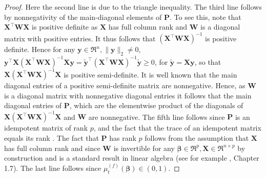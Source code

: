 \documentclass[11pt, a4paper]{article}
\newcommand*{\bb}{\boldsymbol}
\theoremstyle{example} \newtheorem{example}{Example}[section]
\theoremstyle{theorem} \newtheorem{theorem}{Theorem}[section]
\def\by{\bb{y}}
\def\bX{\bb{X}}
\def\by{\bb{y}}
\begin{document}
\begin{proof}
	Here the second line is due to the triangle inequality. The third line follows by nonnegativity of the main-diagonal elements of $\bb P$. To see this, note that $\bb X^\top\bb W\bb X$ is positive definite as $\bb X$ has full column rank and $\bb W$ is a diagonal matrix with positive entries. It thus follows that $(\bb X^\top\bb W\bb X)^{-1}$ is positive definite. Hence for any $\bb y \in \Re^{n}, \|\bb y\|_2\neq 0$, $\bb y^\top\bb X(\bb X^\top\bb W\bb X)^{-1}\bb X \bb y = \tilde{\bb y}^\top(\bb X^\top\bb W\bb X)^{-1} \tilde{\bb y} \geq 0$, for $\tilde{\by} = \bX \by$, so that $\bb X(\bb X^\top\bb W\bb X)^{-1}\bb X$ is positive semi-definite. It is well known that the main diagonal entries of a positive semi-definite matrix are nonnegative. Hence, as $\bb W$ is a diagonal matrix with nonnegative diagonal entries it follows that the main diagonal entries of $\bb P$, which are the elementwise product of the diagonals of $\bb X(\bb X^\top\bb W\bb X)^{-1}\bb X$ and $\bb W$ are nonnegative. The fifth line follows since $\bb P$ is an idempotent matrix of rank $p$, and the fact that the trace of an idempotent matrix equals its rank \citep[Corollary 10.2.2]{harville:1998}. The fact that $\bb P$ has rank $p$ follows from the assumption that $\bb X$ has full column rank and since $\bb W$ is invertible for any $\bb\beta \in \Re^p,\bb X\in \Re^{n \times p}$ by construction and is a standard result in linear algebra (see for example \cite{magnus+neudecker:2019}, Chapter 1.7).  The last line follows since $\mu_t^{(f)}(\bb\beta) \in (0,1)$. 
	
\end{proof}	






% 
\end{document}
